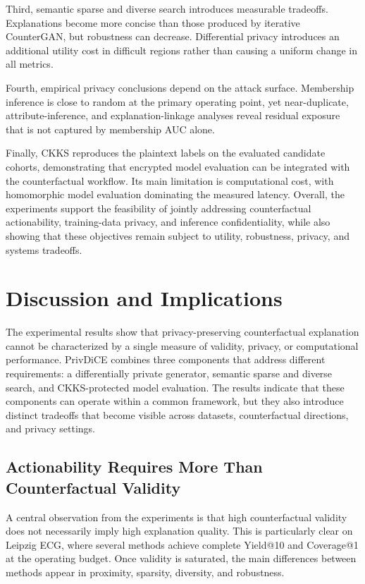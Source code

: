 \documentclass[preprint,12pt]{elsarticle}
\begin{document}
Third, semantic sparse and diverse search introduces measurable tradeoffs.
Explanations become more concise than those produced by iterative CounterGAN,
but robustness can decrease. Differential privacy introduces an additional
utility cost in difficult regions rather than causing a uniform change in all
metrics.

Fourth, empirical privacy conclusions depend on the attack surface. Membership
inference is close to random at the primary operating point, yet near-duplicate,
attribute-inference, and explanation-linkage analyses reveal residual exposure
that is not captured by membership AUC alone.

Finally, CKKS reproduces the plaintext labels on the evaluated candidate
cohorts, demonstrating that encrypted model evaluation can be integrated with
the counterfactual workflow. Its main limitation is computational cost, with
homomorphic model evaluation dominating the measured latency. Overall, the
experiments support the feasibility of jointly addressing counterfactual
actionability, training-data privacy, and inference confidentiality, while also
showing that these objectives remain subject to utility, robustness, privacy,
and systems tradeoffs.



\section{Discussion and Implications}
\label{sec:discussion}

The experimental results show that privacy-preserving counterfactual
explanation cannot be characterized by a single measure of validity, privacy,
or computational performance. PrivDiCE combines three components that address
different requirements: a differentially private generator, semantic sparse
and diverse search, and CKKS-protected model evaluation. The results indicate
that these components can operate within a common framework, but they also
introduce distinct tradeoffs that become visible across datasets,
counterfactual directions, and privacy settings.

\subsection{Actionability Requires More Than Counterfactual Validity}
\label{subsec:discussion_actionability}

A central observation from the experiments is that high counterfactual validity
does not necessarily imply high explanation quality. This is particularly clear
on Leipzig ECG, where several methods achieve complete Yield@10 and Coverage@1
at the operating budget. Once validity is saturated, the main differences
between methods appear in proximity, sparsity, diversity, and robustness.
\end{document}
